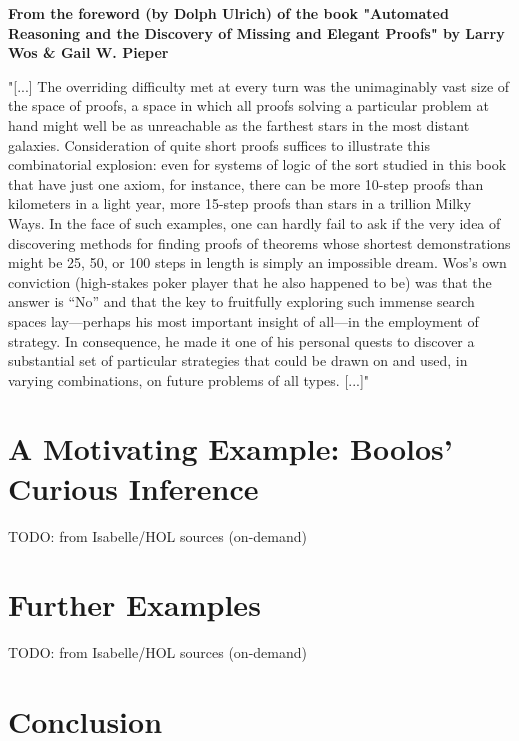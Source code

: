 \documentclass{article}
\begin{document}
\textbf{From the foreword (by Dolph Ulrich) of the book "Automated Reasoning and the Discovery of Missing and Elegant Proofs" by Larry Wos \& Gail W. Pieper}

"[...] The overriding difficulty met at every turn was the unimaginably vast size of the space of proofs, a space in which all proofs solving a particular problem at hand might well be as unreachable as the farthest stars in the most distant galaxies. Consideration of quite short proofs suffices to illustrate this combinatorial explosion: even for systems of logic of the sort studied in this book that have just one axiom, for instance, there can be more 10-step proofs than kilometers in a light year, more 15-step proofs than stars in a trillion Milky Ways.
In the face of such examples, one can hardly fail to ask if the very idea of discovering methods for finding proofs of theorems whose shortest demonstrations might be 25, 50, or 100 steps in length is simply an impossible dream. Wos’s own conviction (high-stakes poker player that he also happened to be) was that the answer is “No” and that the key to fruitfully exploring such immense search spaces lay—perhaps his most important insight of all—in the employment of strategy. In consequence, he made it one of his personal quests to discover a substantial set of particular strategies that could be drawn on and used, in varying combinations, on future problems of all types. [...]"


\section{A Motivating Example: Boolos' Curious Inference}

TODO: from Isabelle/HOL sources (on-demand)

\section{Further Examples}
TODO: from Isabelle/HOL sources (on-demand)

\section{Conclusion}
\end{document}
